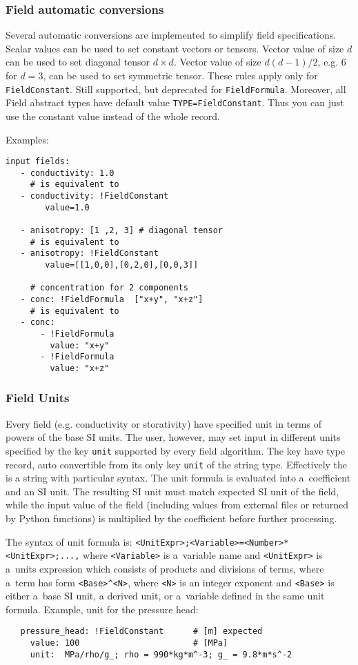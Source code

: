 \subsubsection{Field automatic conversions} 
Several automatic conversions are implemented to simplify field specifications. 
Scalar values can be used to set constant vectors or tensors. 
Vector value of size $d$ can be used to set diagonal tensor $d\times d$.
Vector value of size $d(d-1)/2$, e.g. $6$ for $d=3$, can be used to set symmetric tensor. 
These rules apply only for \verb|FieldConstant|. Still supported, but deprecated for \verb|FieldFormula|.
Moreover, all Field abstract types have default value \verb'TYPE=FieldConstant'. 
Thus you can just use the constant value instead of the whole record.

Examples:
\begin{verbatim}
input fields:
   - conductivity: 1.0
     # is equivalent to
   - conductivity: !FieldConstant
        value=1.0
   
   - anisotropy: [1 ,2, 3] # diagonal tensor
     # is equivalent to
   - anisotropy: !FieldConstant
        value=[[1,0,0],[0,2,0],[0,0,3]]

     # concentration for 2 components   
   - conc: !FieldFormula  ["x+y", "x+z"]
     # is equivalent to
   - conc: 
       - !FieldFormula
         value: "x+y"
       - !FieldFormula
         value: "x+z"
\end{verbatim}

\subsubsection{Field Units}
Every field (e.g. conductivity or storativity) have specified unit in terms of powers of the base SI units. 
The user, however, may set input in different units specified by the key \verb'unit' 
supported by every field algorithm. The key have type  record, auto convertible from its only key 
\verb'unit' of the string type. Effectively the  is a string with particular syntax. 
The unit formula is evaluated  into a~coefficient and an SI unit. The resulting SI unit 
must match expected SI unit of the field, while the input value 
of the field (including values from external files or returned by Python functions)  
is multiplied by the coefficient before further processing.

The syntax of unit formula is: {\tt <UnitExpr>;<Variable>=<Number>*<UnitExpr>;...,}
where {\tt <Variable>} is a~variable name and {\tt <UnitExpr>} is a~units expression
which consists of products and divisions of terms, where a~term has form \verb'<Base>^<N>', 
where {\tt <N>} is an integer exponent and {\tt <Base>} is either a~base SI unit, 
a derived unit, or a~variable defined in the same unit formula.
Example, unit for the pressure head: 
\begin{verbatim}
   pressure_head: !FieldConstant      # [m] expected
     value: 100                       # [MPa] 
     unit:  MPa/rho/g_; rho = 990*kg*m^-3; g_ = 9.8*m*s^-2     
\end{verbatim}

